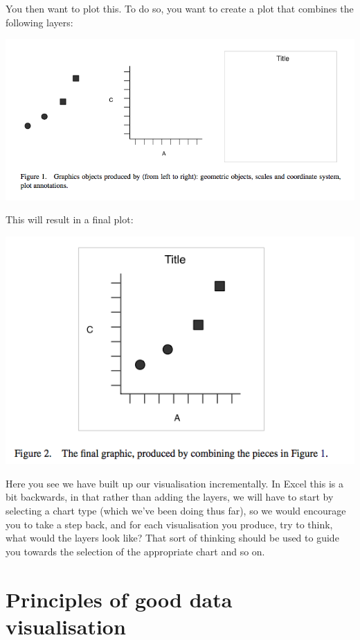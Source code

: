 \documentclass[
]{book}
\begin{document}
You then want to plot this. To do so, you want to create a plot that combines the following layers:

\includegraphics{imgs/layers.png}

This will result in a final plot:

\includegraphics{imgs/combined.png}

Here you see we have built up our visualisation incrementally. In Excel this is a bit backwards, in that rather than adding the layers, we will have to start by selecting a chart type (which we've been doing thus far), so we would encourage you to take a step back, and for each visualisation you produce, try to think, what would the layers look like? That sort of thinking should be used to guide you towards the selection of the appropriate chart and so on.

\hypertarget{principles-of-good-data-visualisation}{%
\section{Principles of good data visualisation}\label{principles-of-good-data-visualisation}}
\end{document}
